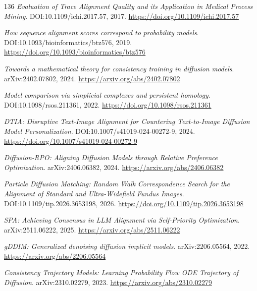 \documentclass[11pt,a4paper]{article}
\begin{document}
\begin{thebibliography}{136}
\newblock \emph{Evaluation of Trace Alignment Quality and its Application in Medical Process Mining}.
\newblock DOI:10.1109/ichi.2017.57, 2017.
\newblock \url{https://doi.org/10.1109/ichi.2017.57}

\newblock \emph{How sequence alignment scores correspond to probability models}.
\newblock DOI:10.1093/bioinformatics/btz576, 2019.
\newblock \url{https://doi.org/10.1093/bioinformatics/btz576}

\newblock \emph{Towards a mathematical theory for consistency training in diffusion models}.
\newblock arXiv:2402.07802, 2024.
\newblock \url{https://arxiv.org/abs/2402.07802}

\newblock \emph{Model comparison via simplicial complexes and persistent homology}.
\newblock DOI:10.1098/rsos.211361, 2022.
\newblock \url{https://doi.org/10.1098/rsos.211361}

\newblock \emph{DTIA: Disruptive Text-Image Alignment for Countering Text-to-Image Diffusion Model Personalization}.
\newblock DOI:10.1007/s41019-024-00272-9, 2024.
\newblock \url{https://doi.org/10.1007/s41019-024-00272-9}

\newblock \emph{Diffusion-RPO: Aligning Diffusion Models through Relative Preference Optimization}.
\newblock arXiv:2406.06382, 2024.
\newblock \url{https://arxiv.org/abs/2406.06382}

\newblock \emph{Particle Diffusion Matching: Random Walk Correspondence Search for the Alignment of Standard and Ultra-Widefield Fundus Images}.
\newblock DOI:10.1109/tip.2026.3653198, 2026.
\newblock \url{https://doi.org/10.1109/tip.2026.3653198}

\newblock \emph{SPA: Achieving Consensus in LLM Alignment via Self-Priority Optimization}.
\newblock arXiv:2511.06222, 2025.
\newblock \url{https://arxiv.org/abs/2511.06222}

\newblock \emph{gDDIM: Generalized denoising diffusion implicit models}.
\newblock arXiv:2206.05564, 2022.
\newblock \url{https://arxiv.org/abs/2206.05564}

\newblock \emph{Consistency Trajectory Models: Learning Probability Flow ODE Trajectory of Diffusion}.
\newblock arXiv:2310.02279, 2023.
\newblock \url{https://arxiv.org/abs/2310.02279}


\end{thebibliography}
\end{document}
